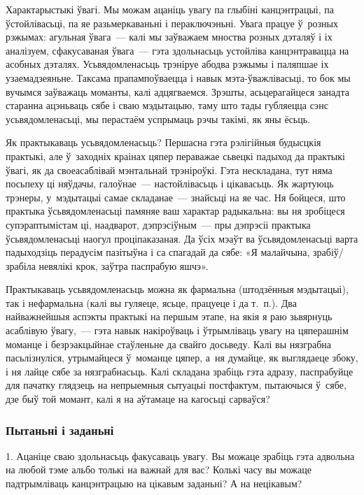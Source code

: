 Характарыстыкі ўвагі. Мы можам ацаніць увагу па глыбіні канцэнтрацыі, па ўстойлівасьці, па яе разьмеркаваньні і пераключэньні. Увага працуе ў~розных рэжымах: агульная ўвага~--- калі мы заўважаем мноства розных дэталяў і іх аналізуем, сфакусаваная ўвага~--- гэта здольнасьць устойліва канцэнтравацца на асобных дэталях. Усьвядомленасьць трэніруе абодва рэжымы і паляпшае іх узаемадзеяньне. Таксама прапампоўваецца і навык мэта-ўважлівасьці, то бок мы вучымся заўважаць моманты, калі адцягваемся. Зрэшты, асьцерагайцеся занадта старанна ацэньваць сябе і сваю мэдытацыю, таму што тады губляецца сэнс усьвядомленасьці, мы перастаём успрымаць рэчы такімі, як яны ёсьць.

Як практыкаваць усьвядомленасьць? Першасна гэта рэлігійныя будысцкія практыкі, але ў~заходніх краінах цяпер пераважае сьвецкі падыход да практыкі ўвагі, як да своеасаблівай мэнтальнай трэніроўкі. Гэта нескладана, тут няма посьпеху ці няўдачы, галоўнае~--- настойлівасьць і цікавасьць. Як жартуюць трэнеры, у~мэдытацыі самае складанае~--- знайсьці на яе час. Ня бойцеся, што практыка ўсьвядомленасьці памяняе ваш характар радыкальна: вы ня зробіцеся супэраптымістам ці, наадварот, дэпрэсіўным~--- пры дэпрэсіі практыка ўсьвядомленасьці наогул проціпаказаная. Да ўсіх мэаўт ва ўсьвядомленасьці варта падыходзіць перадусім пазітыўна і са спагадай да сябе: «Я малайчына, зрабіў/зрабіла невялікі крок, заўтра паспрабую яшчэ».

Практыкаваць усьвядомленасьць можна як фармальна (штодзённыя мэдытацыі), так і нефармальна (калі вы гуляеце, ясьце, працуеце і да т.~п.). Два найважнейшыя аспэкты практыкі на першым этапе, на якія я раю зьвярнуць асаблівую ўвагу,~--- гэта навык накіроўваць і ўтрымліваць увагу на цяперашнім моманце і безрэакцыйнае стаўленьне да свайго досьведу. Калі вы нязграбна пасьлізнуліся, утрымайцеся ў~моманце цяпер, а~ня думайце, як выглядаеце збоку, і ня лайце сябе за нязграбнасьць. Калі складана зрабіць гэта адразу, паспрабуйце для пачатку глядзець на непрыемныя сытуацыі постфактум, пытаючыся ў~сябе, дзе быў той момант, калі я на аўтамаце на кагосьці сарваўся?

\subsubsection{Пытаньні і заданьні}

1. Ацаніце сваю здольнасьць факусаваць увагу. Вы можаце зрабіць гэта адвольна на любой тэме альбо толькі на важнай для вас? Колькі часу вы можаце падтрымліваць канцэнтрацыю на цікавым заданьні? А на нецікавым?

